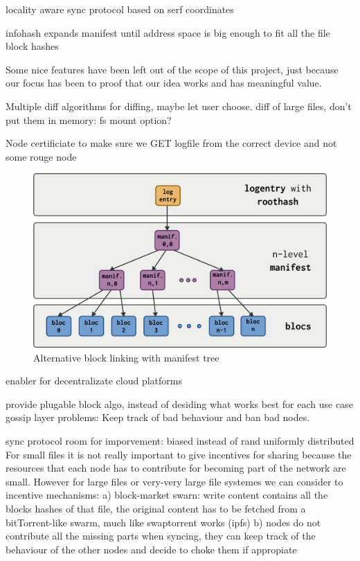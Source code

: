 \documentclass{sig-alternate}
\begin{document}
locality aware sync protocol based on serf coordinates

infohash expands manifest until address space is big enough to fit all the file block hashes

Some nice features have been left out of the scope of this project, just because our focus has been to proof that our idea works and has meaningful value.

Multiple diff algorithms for diffing, maybe let user choose.
diff of large files, don't put them in memory: fs mount option?

Node certificiate to make sure we GET logfile from the correct device and not some rouge node
\begin{figure}[htp]
\centering
\includegraphics[width=\columnwidth]{imgs/infohash.png}
\caption{Alternative block linking with manifest tree}
\label{fig:infohash}
\end{figure}


enabler for decentralizate cloud platforms

provide plugable block algo, instead of desiding what works best for each use case 
gossip layer problems: Keep track of bad behaviour and ban bad nodes.

sync protocol room for imporvement: biased instead of rand uniformly distributed
For small files it is not really important to give incentives for sharing because the resources that each node has to contribute for becoming part of the network are small. However for large files or very-very large file systemes we can consider to incentive mechanisms:
    a) block-market swarn: write content contains all the blocks hashes of that file, the original content has to be fetched from a bitTorrent-like swarm, much like swaptorrent works (ipfs)
    b) nodes do not contribute all the missing parts when syncing, they can keep track of the behaviour of the other nodes and decide to choke them if appropiate
\end{document}

